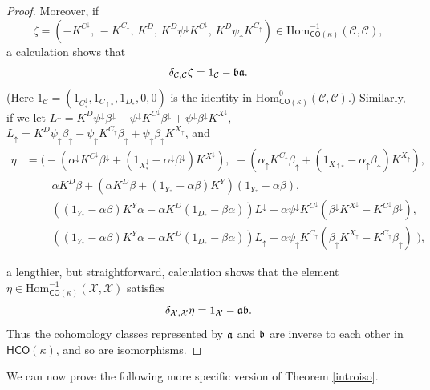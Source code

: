 \documentclass[11pt]{amsart}
\theoremstyle{definition}
\theoremstyle{remark}
\numberwithin{equation}{section}
\begin{document}
\begin{proof}
 	Moreover, if \[ \zeta=(-K^{C^{\downarrow}},\,-K^{C_{\uparrow}},\,K^D,\,K^D\psi^{\downarrow}K^{C^{\downarrow}},\,K^D\psi_{\uparrow}K^{C_{\uparrow}})\in \mathrm{Hom}^{-1}_{\mathsf{CO}(\kappa)}(\mathcal{C},\mathcal{C}), \] a calculation shows that \[ \delta_{\mathcal{C},\mathcal{C}}\zeta=1_{\mathcal{C}}-\frak{ba}.\] (Here $1_{\mathcal{C}}=(1_{C^{\downarrow}_{*}},1_{C_{\uparrow *}},1_{D_*},0,0)$ is the identity in $\mathrm{Hom}^0_{\mathsf{CO}(\kappa)}(\mathcal{C},\mathcal{C})$.)  Similarly, if we let $L^{\downarrow}=K^D\psi^{\downarrow}\beta^{\downarrow}-\psi^{\downarrow}K^{C^{\downarrow}}\beta^{\downarrow}+\psi^{\downarrow}\beta^{\downarrow}K^{X^{\downarrow}}$,  $L_{\uparrow}=K^D\psi_{\uparrow}\beta_{\uparrow}-\psi_{\uparrow}K^{C_{\uparrow}}\beta_{\uparrow}+\psi_{\uparrow}\beta_{\uparrow}K^{X_{\uparrow}}$, and \begin{align*} \eta &=\bigg( -(\alpha^{\downarrow}K^{C^{\downarrow}}\beta^{\downarrow}+(1_{X^{\downarrow}_{*}}-\alpha^{\downarrow}\beta^{\downarrow})K^{X^{\downarrow}}),\,\,-(\alpha_{\uparrow}K^{C_{\uparrow}}\beta_{\uparrow}+(1_{X_{\uparrow*}}-\alpha_{\uparrow}\beta_{\uparrow})K^{X_{\uparrow}}),\\ & \qquad\,\, \alpha K^{D}\beta+\left(\alpha K^D\beta+(1_{Y_*}-\alpha\beta)K^Y\right)(1_{Y_*}-\alpha\beta),\\ & \qquad\,\, \left((1_{Y_*}-\alpha\beta)K^Y\alpha-\alpha K^D(1_{D_*}-\beta\alpha) \right)L^{\downarrow}+\alpha\psi^{\downarrow}K^{C^{\downarrow}}(\beta^{\downarrow}K^{X^{\downarrow}}-K^{C^{\downarrow}}\beta^{\downarrow}), \\ & \qquad\,\,
 	\left((1_{Y_*}-\alpha\beta)K^Y\alpha-\alpha K^D(1_{D_*}-\beta\alpha) \right)L_{\uparrow}+\alpha\psi_{\uparrow}K^{C_{\uparrow}}(\beta_{\uparrow}K^{X_{\uparrow}}-K^{C_{\uparrow}}\beta_{\uparrow})\,\, \bigg ), \end{align*}	 	 

a lengthier, but straightforward, calculation shows that
the element $\eta\in \mathrm{Hom}^{-1}_{\mathsf{CO}(\kappa)}(\mathcal{X},\mathcal{X})$ satisfies \[ \delta_{\mathcal{X},\mathcal{X}}\eta=1_{\mathcal{X}}-\frak{ab}.\]
Thus the cohomology classes represented by $\frak{a}$ and $\frak{b}$ are inverse to each other in $\mathsf{HCO}(\kappa)$, and so are isomorphisms.

\end{proof}	

We can now prove the following more specific version of Theorem \ref{introiso}.
	
\end{document}
